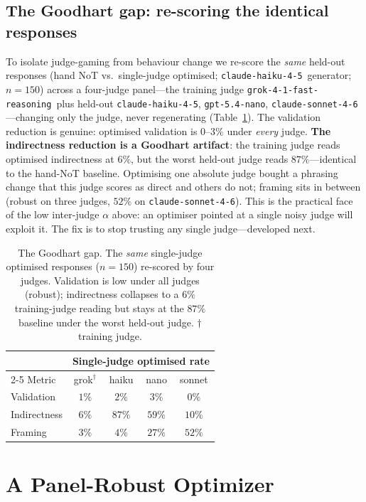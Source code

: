 \documentclass[11pt]{article}
\newcommand{\nano}{\texttt{gpt-5.4-nano}}
\newcommand{\haiku}{\texttt{claude-haiku-4-5}}
\newcommand{\sonnet}{\texttt{claude-sonnet-4-6}}
\newcommand{\grok}{\texttt{grok-4-1-fast-reasoning}}
\begin{document}
\subsection{The Goodhart gap: re-scoring the identical responses}
\label{sec:goodhart}
To isolate judge-gaming from behaviour change we re-score the \emph{same} held-out responses (hand NoT
vs.\ single-judge optimised; \haiku\ generator; $n{=}150$) across a four-judge panel---the training judge
\grok\ plus held-out \haiku, \nano, \sonnet---changing only the judge, never regenerating
(Table~\ref{tab:goodhart}). The validation reduction is genuine: optimised validation is $0$--$3\%$
under \emph{every} judge. \textbf{The indirectness reduction is a Goodhart artifact}: the training judge
reads optimised indirectness at $6\%$, but the worst held-out judge reads $87\%$---identical to the
hand-NoT baseline. Optimising one absolute judge bought a phrasing change that this judge scores as
direct and others do not; framing sits in between (robust on three judges, $52\%$ on \sonnet). This is
the practical face of the low inter-judge $\alpha$ above: an optimiser pointed at a single noisy judge
will exploit it. The fix is to stop trusting any single judge---developed next.

\begin{table}[t]
\centering
\small
\setlength{\tabcolsep}{5pt}
\begin{tabular}{lcccc}
\toprule
 & \multicolumn{4}{c}{Single-judge optimised rate} \\
\cmidrule(lr){2-5}
Metric & grok$^\dagger$ & haiku & nano & sonnet \\
\midrule
Validation   & $1\%$ & $2\%$  & $3\%$  & $0\%$ \\
Indirectness & $6\%$ & $87\%$ & $59\%$ & $10\%$ \\
Framing      & $3\%$ & $4\%$  & $27\%$ & $52\%$ \\
\bottomrule
\end{tabular}
\caption{The Goodhart gap. The \emph{same} single-judge optimised responses ($n{=}150$) re-scored by
four judges. Validation is low under all judges (robust); indirectness collapses to a $6\%$
training-judge reading but stays at the $87\%$ baseline under the worst held-out judge. $\dagger$
training judge.}
\label{tab:goodhart}
\end{table}

\section{A Panel-Robust Optimizer}
\label{sec:robust}
\end{document}
